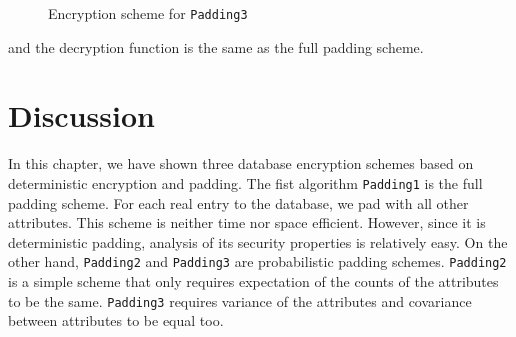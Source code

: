 \begin{figure}[H]
\begin{center}
\begin{pchstack}
	
	\pchspace
\end{pchstack}
\end{center}
\caption{Encryption scheme for \texttt{Padding3}}
\end{figure}


and the decryption function is the same as the full padding scheme.


\section{Discussion}
In this chapter, we have shown three database encryption schemes based on deterministic encryption and padding. The fist algorithm \texttt{Padding1} is the full padding scheme. For each real entry to the database, we pad with all other attributes. This scheme is neither time nor space efficient. However, since it is deterministic padding, analysis of its security properties is relatively easy. On the other hand, \texttt{Padding2} and \texttt{Padding3} are probabilistic padding schemes. \texttt{Padding2} is a simple scheme that only requires expectation of the counts of the attributes to be the same. \texttt{Padding3} requires variance of the attributes and covariance between attributes to be equal too.
